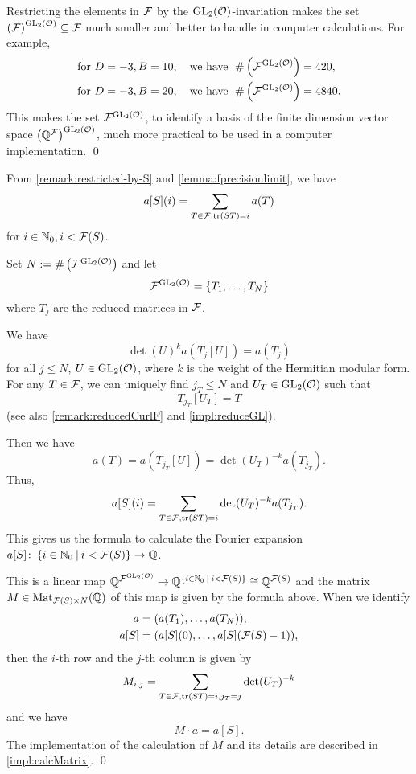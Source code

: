 \begin{remark}
Restricting the elements in $\mathcal{F}$ by the $\operatorname{GL}_2(\mathcal{O})$-invariation makes the set ${\left(\mathcal{F}\right)}^{\operatorname{GL}_2(\mathcal{O})} \subseteq \mathcal{F}$ much smaller and better to handle in computer calculations.
For example,
\begin{align*}
& \text{for } D=-3, B=10,\quad \text{we have } \; \# \left({\mathcal{F}}^{\operatorname{GL}_2(\mathcal{O})}\right) = 420, \\
& \text{for } D=-3, B=20,\quad \text{we have } \; \# \left({\mathcal{F}}^{\operatorname{GL}_2(\mathcal{O})}\right) = 4840.
\end{align*}
%
This makes the set ${\mathcal{F}}^{\operatorname{GL}_2(\mathcal{O})}$, to identify a basis of the finite dimension vector space ${\left(\mathbb{Q}^{\mathcal{F}}\right)}^{\operatorname{GL}_2(\mathcal{O})}$, much more practical to be used in a computer implementation.
\qed
\end{remark}

\begin{remark}
\label{remark:how-to-calc-aS}
From \cref{remark:restricted-by-S} and \cref{lemma:fprecisionlimit}, we have
\[ a[S] (i) = \sum_{T \in \mathcal{F}, \textup{\textrm{tr}}(S T) = i} a(T) \]
for $i \in \mathbb{N}_0, i < \mathcal{F}(S)$.

Set $N := \# \left( {\mathcal{F}}^{\operatorname{GL}_2(\mathcal{O})} \right)$ and let
\[ \invarF{\F}{\GL_2(\curlO)} = \Set{T_1, \dots, T_N} \]
where $T_j$ are the reduced matrices in $\mathcal{F}$.

We have
\[ \det(U)^k a(T_j[U]) = a(T_j) \] %
for all $j \le N$, $U \in \operatorname{GL}_2(\mathcal{O})$, where $k$ is the weight of the Hermitian modular form.
For any $T \in \mathcal{F}$, we can uniquely find $j_T \le N$ and $U_T \in \operatorname{GL}_2(\mathcal{O})$ such that
\[ T_{j_T}[U_T] = T \]
(see also \cref{remark:reducedCurlF} and \cref{impl:reduceGL}).

Then we have
\[ a(T) = a(T_{j_T}[U]) = \det(U_T)^{-k} a(T_{j_T}) . \]
Thus,
\[ a[S] (i) =  \sum_{T \in \mathcal{F}, \textup{\textrm{tr}}(S T) = i} \det(U_T)^{-k} a(T_{j_T}) . \]
This gives us the formula to calculate the Fourier expansion $a[S] \colon \Set{i \in \N_0}{i < \FPrecisionLimit{S}} \rightarrow \Q$.

This is a linear map $\Q^{\invarF{\F}{\GL_2(\curlO)}} \rightarrow \Q^{\Set{i \in \N_0}{i < \FPrecisionLimit{S}}} \cong \Q^{\FPrecisionLimit{S}}$ and the matrix $M \in \operatorname{Mat}_{\mathcal{F}(S) \times N}(\mathbb{Q})$ of this map is given by the formula above. When we identify
\begin{align*}
a = & \; (a(T_1), \dots, a(T_N)), \\
a[S] = & \; (a[S](0), \dots, a[S](\mathcal{F}(S) - 1)),
\end{align*}
then the $i$-th row and the $j$-th column is given by
\[ M_{i,j} =  \sum_{T \in \mathcal{F}, \textup{\textrm{tr}}(S T) = i, j_T = j} \det(U_T)^{-k} \]
and we have
\[ M \cdot a = a[S] . \]
The implementation of the calculation of $M$ and its details are described in \cref{impl:calcMatrix}.
\qed
\end{remark}


